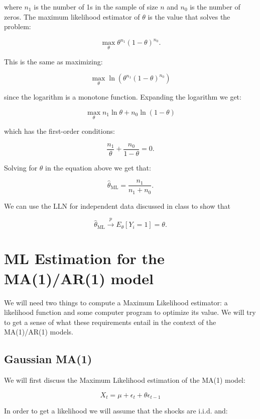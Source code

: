 \documentclass[12] {article}
\begin{document}
\noindent where $n_1$ is the number of 1s in the sample of size $n$ and $n_0$ is the number of zeros. The maximum likelihood estimator of $\theta$ is the value that solves the problem:

\[  \max_{\theta}  \theta^{n_1} (1-\theta)^{n_0}.  \]

\noindent This is the same as maximizing:

\[  \max_{\theta} \ln \left(  \theta^{n_1} (1-\theta)^{n_0} \right)  \]

\noindent since the logarithm is a monotone function. Expanding the logarithm we get:

\[  \max_{\theta}   n_1 \ln \theta + n_0 \ln (1-\theta)   \]

\noindent which has the first-order conditions:

\[ \frac{n_1}{\theta} + \frac{n_0}{1-\theta}  = 0.\]

\noindent Solving for $\theta$ in the equation above we get that:

\[ \widehat{\theta}_{\textrm{ML}} = \frac{n_1}{n_1+ n_0}. \]

\noindent We can use the LLN for independent data discussed in class to show that 

$$ \widehat{\theta}_{\textrm{ML}} \overset{p}{\rightarrow} E_{\theta}[  Y_i = 1  ] = \theta.$$
 
\newpage 
 
 \section{ML Estimation for the MA(1)/AR(1) model}
 
We will need two things to compute a Maximum Likelihood estimator: a likelihood function and some computer program to optimize its value. We will try to get a sense of what these requirements entail in the context of the MA(1)/AR(1) models. 

\subsection{Gaussian MA(1)}
We will first discuss the Maximum Likelihood estimation of the MA(1) model: 

\begin{equation} \label{equation:MA1}
X_t = \mu + \epsilon_t + \theta \epsilon_{t-1} 
\end{equation}

\noindent In order to get a likelihood we will assume that the shocks are i.i.d. and:
\end{document}
